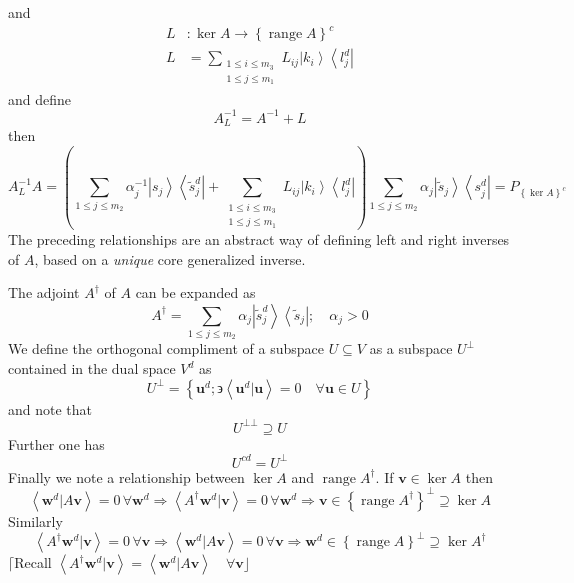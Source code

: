 \documentclass[aps,preprint]{revtex4}%
\begin{document}
and
\begin{align}
L  & :\ker A\longrightarrow\left\{  \operatorname{range}A\right\}
^{c}\nonumber\\
L  & =\sum_{\substack{1\leq i\leq m_{3} \\1\leq j\leq m_{1} }}L_{ij}\left\vert
k_{i}\right\rangle \left\langle l_{j}^{d}\right\vert
\end{align}
and define
\begin{equation}
A_{L}^{-1}=A^{-1}+L
\end{equation}
then
\begin{equation}
A_{L}^{-1}A=\left(  \sum_{1\leq j\leq m_{2}}\alpha_{j}^{-1}\left\vert
s_{j}\right\rangle \left\langle \tilde{s}_{j}^{d}\right\vert +\sum
_{\substack{1\leq i\leq m_{3} \\1\leq j\leq m_{1} }}L_{ij}\left\vert
k_{i}\right\rangle \left\langle l_{j}^{d}\right\vert \right)  \sum_{1\leq
j\leq m_{2}}\alpha_{j}\left\vert \tilde{s}_{j}\right\rangle \left\langle
s_{j}^{d}\right\vert =P_{\left\{  \ker A\right\}  ^{c}}%
\end{equation}
The preceding relationships are an abstract way of defining left and right
inverses of $A$, based on a \emph{unique} core generalized inverse.

The adjoint $A^{\dagger}$ of $A$ can be expanded as
\begin{equation}
A^{\dagger}=\sum_{1\leq j\leq m_{2}}\alpha_{j}\left\vert \tilde{s}_{j}%
^{d}\right\rangle \left\langle \tilde{s}_{j}\right\vert ;\quad\alpha_{j}>0
\end{equation}
We define the orthogonal compliment of a subspace $U\subseteq V$ as a subspace
$U^{\bot}$ contained in the dual space $V^{d}$ as
\begin{equation}
U^{\bot}=\left\{  \mathbf{u}^{d};\backepsilon\left\langle \mathbf{u}%
^{d}|\mathbf{u}\right\rangle =0\quad\forall\mathbf{u\in}U\right\}
\end{equation}
and note that
\begin{equation}
U^{\bot\bot}\supseteq U
\end{equation}
Further one has
\begin{equation}
U^{cd}=U^{\bot}%
\end{equation}
Finally we note a relationship between $\ker A$ and $\operatorname{range}%
A^{\dagger}$. If $\mathbf{v}\in\ker A$ then%
\begin{equation}
\left\langle \mathbf{w}^{d}|A\mathbf{v}\right\rangle =0\,\forall\mathbf{w}%
^{d}\Rightarrow\left\langle A^{\dagger}\mathbf{w}^{d}|\mathbf{v}\right\rangle
=0\,\forall\mathbf{w}^{d}\Rightarrow\mathbf{v}\in\left\{  \operatorname{range}%
A^{\dagger}\right\}  ^{\bot}\supseteq\ker A
\end{equation}
Similarly
\begin{equation}
\left\langle A^{\dagger}\mathbf{w}^{d}|\mathbf{v}\right\rangle =0\,\forall
\mathbf{v}\Rightarrow\left\langle \mathbf{w}^{d}|A\mathbf{v}\right\rangle
=0\,\forall\mathbf{v}\Rightarrow\mathbf{w}^{d}\in\left\{  \operatorname{range}%
A\right\}  ^{\bot}\supseteq\ker A^{\dagger}%
\end{equation}
$\lceil$Recall $\left\langle A^{\dagger}\mathbf{w}^{d}|\mathbf{v}\right\rangle
=\left\langle \mathbf{w}^{d}|A\mathbf{v}\right\rangle \quad\forall
\mathbf{v\rfloor}\ \ $
\end{document}
